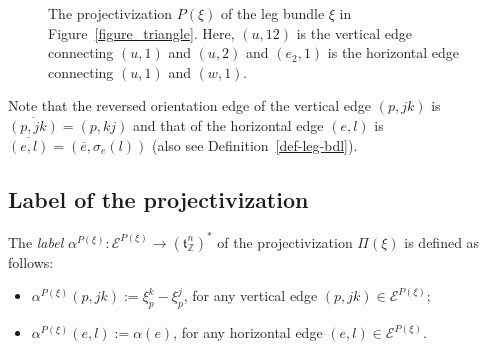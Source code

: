 \documentclass[12pt]{amsart}
\theoremstyle{definition}
\theoremstyle{remark}
\numberwithin{equation}{section}
\begin{document}
\begin{figure}[H]
\centering
{}
\caption{The projectivization $P(\xi)$ of the leg bundle $\xi$ in Figure~\ref{figure_triangle}. Here, $(u,12)$ is the vertical edge connecting $(u,1)$ and $(u,2)$ and $(e_{2},1)$ is the horizontal edge connecting $(u,1)$ and $(w,1)$.}
\label{abstract_projectivization}
\end{figure}

Note that
the reversed orientation edge of the vertical edge $(p,jk)$ is $\overline{(p,jk)}=(p,kj)$
and that of the horizontal edge $(e,l)$ is
$\overline{(e,l)}=(\overline{e},\sigma_{e}(l))$ (also see Definition~\ref{def-leg-bdl}).

\subsection{Label of the projectivization}
\label{sect:3.2}
The {\it label} $\alpha^{P(\xi)}:\mathcal{E}^{P(\xi)}\to (\mathfrak{t}_{\mathbb{Z}}^{n})^{*}$ of the projectivization $\Pi(\xi)$ is defined as follows:
\begin{itemize}
\item $\alpha^{P(\xi)}(p,jk):=\xi_{p}^{k}-\xi_{p}^{j}$, for any vertical edge $(p,jk)\in \mathcal{E}^{P(\xi)}$;
\item $\alpha^{P(\xi)}(e,l):=\alpha(e)$, for any horizontal edge $(e,l)\in \mathcal{E}^{P(\xi)}$.
\end{itemize}
\end{document}
